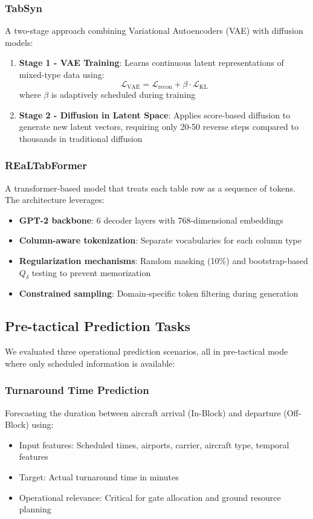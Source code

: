 \documentclass[conference]{IEEEtran}
\begin{document}
\subsubsection{TabSyn} \cite{zhang2024mixed}
A two-stage approach combining Variational Autoencoders (VAE) with diffusion models:
\begin{enumerate}
    \item \textbf{Stage 1 - VAE Training}: Learns continuous latent representations of mixed-type data using:
    \begin{equation}
    \mathcal{L}_{\text{VAE}} = \mathcal{L}_{\text{recon}} + \beta \cdot \mathcal{L}_{\text{KL}}
    \end{equation}
    where $\beta$ is adaptively scheduled during training
    \item \textbf{Stage 2 - Diffusion in Latent Space}: Applies score-based diffusion to generate new latent vectors, requiring only 20-50 reverse steps compared to thousands in traditional diffusion
\end{enumerate}

\subsubsection{REaLTabFormer} \cite{solatorio2023realtabformer}
A transformer-based model that treats each table row as a sequence of tokens. The architecture leverages:
\begin{itemize}
    \item \textbf{GPT-2 backbone}: 6 decoder layers with 768-dimensional embeddings
    \item \textbf{Column-aware tokenization}: Separate vocabularies for each column type
    \item \textbf{Regularization mechanisms}: Random masking (10\%) and bootstrap-based $Q_\delta$ testing to prevent memorization
    \item \textbf{Constrained sampling}: Domain-specific token filtering during generation
\end{itemize}

\subsection{Pre-tactical Prediction Tasks}

We evaluated three operational prediction scenarios, all in pre-tactical mode where only scheduled information is available:

\subsubsection{Turnaround Time Prediction}
Forecasting the duration between aircraft arrival (In-Block) and departure (Off-Block) using:
\begin{itemize}
    \item Input features: Scheduled times, airports, carrier, aircraft type, temporal features
    \item Target: Actual turnaround time in minutes
    \item Operational relevance: Critical for gate allocation and ground resource planning
\end{itemize}
\end{document}
